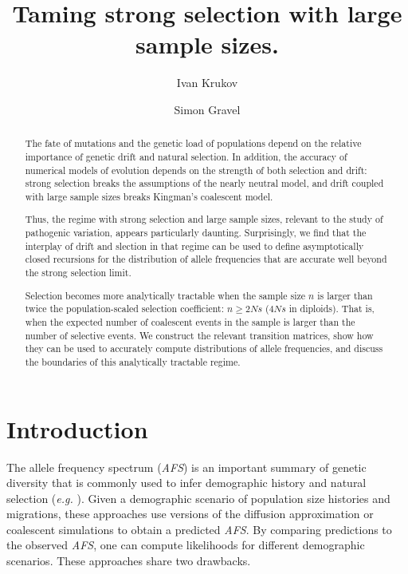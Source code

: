 \documentclass[review,nonatbib]{elsarticle}
\begin{document}
\begin{frontmatter}
  \title{ Taming strong selection with large sample sizes. }

  \author{Ivan Krukov}
  \author{Simon Gravel}

  \begin{abstract}

    The fate of mutations and the genetic load of populations depend on the relative importance of
    genetic drift and natural selection. In addition, the accuracy of numerical models of evolution
    depends on the strength of both selection and drift: strong selection breaks the assumptions of
    the nearly neutral model, and drift coupled with large sample sizes breaks
    Kingman's coalescent model.

    Thus, the regime with strong selection and large sample sizes, relevant to the study of pathogenic
    variation, appears particularly daunting.  Surprisingly, we find that the interplay of drift and slection
    in that regime can be used to define asymptotically closed recursions for the distribution of allele
    frequencies that are accurate well beyond the strong selection limit.

    Selection becomes more analytically tractable when the sample size $n$ is larger than twice the
    population-scaled selection coefficient: $n \ge 2Ns$ ($4Ns$ in diploids). That is, when the
    expected number of coalescent events in the sample is larger than the number of selective events.  We
    construct the relevant transition matrices, show how they can be used to accurately compute
    distributions of allele frequencies, and discuss the boundaries of this analytically tractable
    regime.

  \end{abstract}

\end{frontmatter}

\section{Introduction}
\label{sec_introduciton}

The allele frequency spectrum (\textit{AFS}) is an important summary of genetic diversity that is
commonly used to infer demographic history and natural selection (\textit{e.g.}
\cite{GutenkunstEtAl2009, KammEtAl2017, JouganousEtAl2017}). Given a demographic scenario of
population size histories and migrations, these approaches use versions of the diffusion
approximation or coalescent simulations to obtain a predicted \textit{AFS}. By comparing
predictions to the observed \textit{AFS}, one can compute likelihoods for different demographic
scenarios. These approaches share two drawbacks.
\end{document}
